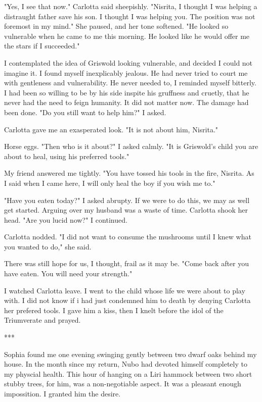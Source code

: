 \documentclass{article}
\begin{document}
"Yes, I see that now." Carlotta said sheepishly. "Nisrita, I thought I was helping a distraught father save his son. I thought I was helping you. The position was not foremost in my mind." She paused, and her tone softened. "He looked so vulnerable when he came to me this morning. He looked like he would offer me the stars if I succeeded."

I contemplated the idea of Griswold looking vulnerable, and decided I could not imagine it. I found myself inexplicably jealous. He had never tried to court me with gentleness and vulnerability. He never needed to, I reminded myself bitterly. I had been so willing to be by his side inspite his gruffness and cruetly, that he never had the need to feign humanity. It did not matter now. The damage had been done. "Do you still want to help him?" I asked.

Carlotta gave me an exasperated look. "It is not about him, Nisrita."

Horse eggs. "Then who is it about?" I asked calmly. "It is Griswold's child you are about to heal, using his preferred tools."

My friend answered me tightly. "You have tossed his tools in the fire, Nisrita. As I said when I came here, I will only heal the boy if you wish me to."

"Have you eaten today?" I asked abrupty. If we were to do this, we may as well get started. Arguing over my husband was a waste of time. Carlotta shook her head. "Are you lucid now?" I continued.

Carlotta nodded. "I did not want to consume the mushrooms until I knew what you wanted to do," she said.

There was still hope for us, I thought, frail as it may be. "Come back after you have eaten. You will need your strength."

I watched Carlotta leave. I went to the child whose life we were about to play with. I did not know if i had just condemned him to death by denying Carlotta her prefered tools. I gave him a kiss, then I knelt before the idol of the Triumverate and prayed.

***

Sophia found me one evening swinging gently between two dwarf oaks behind my house. In the month since my return, Nubo had devoted himself completely to my physcial health. This hour of hanging on a Liri hammock between two short stubby trees, for him, was a non-negotiable aspect. It was a pleasant enough impossition. I granted him the desire.
\end{document}
